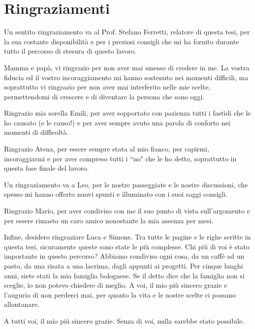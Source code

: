 \documentclass[12pt,a4paper]{report}
\begin{document}











\nocite{*}



\chapter*{Ringraziamenti} 
Un sentito ringraziamento va al Prof. Stefano Ferretti, relatore di questa tesi, per la sua costante disponibilit\`a e per i preziosi consigli che mi ha fornito durante tutto il percorso di stesura di questo lavoro. 

Mamma e pap\`a, vi ringrazio per non aver mai smesso di credere in me. La vostra fiducia ed il vostro incoraggiamento mi hanno sostenuto nei momenti difficili, ma soprattutto vi ringrazio  per non aver mai interferito nelle mie scelte, permettendomi di crescere e di diventare la persona che sono oggi.

Ringrazio mia sorella Emili, per aver sopportato con pazienza tutti i fastidi che le ho causato (e le causo!) e per aver sempre avuto una parola di conforto nei momenti di difficolt\`a.

Ringrazio Atena, per essere sempre stata al mio fianco, per capirmi, incoraggiarmi e per aver compreso tutti i ``no" che le ho detto, soprattutto in questa fase finale del lavoro. 

Un ringraziamento  va a Leo, per le nostre passeggiate e le nostre discussioni, che spesso mi hanno offerto nuovi spunti e illuminato con i suoi saggi consigli. 

Ringrazio Mario, per aver condiviso con me il suo punto di vista sull'argomento e per essere rimasto un caro amico nonostante la mia assenza per mesi. 

Infine, desidero ringraziare Luca e Simone. Tra tutte le pagine e le righe scritte in questa tesi, sicuramente queste sono state le pi\`u complesse. Chi pi\`u di voi \`e stato importante in questo percorso? Abbiamo condiviso ogni cosa, da un caff\`e ad un pasto, da una risata a una lacrima, dagli appunti ai progetti. Per cinque lunghi anni, siete stati la mia famiglia bolognese. Se il detto dice che la famiglia non si sceglie, io non potevo chiedere di meglio. A voi, il mio pi\`u sincero grazie e l'augurio di non perderci mai, per quanto la vita e le nostre scelte ci possano allontanare.

A tutti voi, il mio pi\`u sincero grazie. Senza di voi, nulla sarebbe stato possibile.
\end{document}
